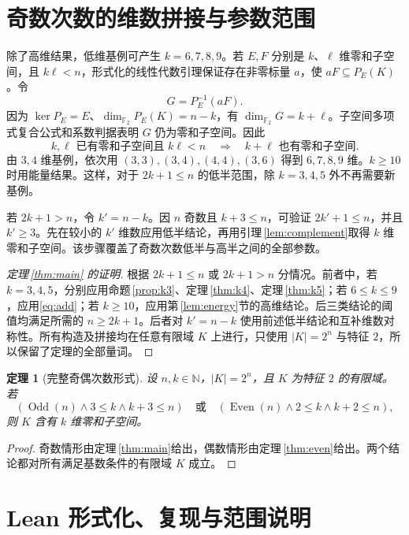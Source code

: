 \documentclass[UTF8,a4paper,11pt]{ctexart}
\numberwithin{equation}{section}
\newtheorem{theorem}{定理}[section]
\theoremstyle{definition}
\theoremstyle{remark}
\newcommand{\Ftwo}{\mathbb F_2}
\newcommand{\dimf}{\dim_{\Ftwo}}
\begin{document}
\section{奇数次数的维数拼接与参数范围}

除了高维结果，低维基例可产生 $k=6,7,8,9$。若 $E,F$ 分别是 $k$、$\ell$ 维零和子空间，且 $k\ell<n$，形式化的线性代数引理保证存在非零标量 $a$，使 $aF\subseteq P_E(K)$。令
\[
 G=P_E^{-1}(aF).
\]
因为 $\ker P_E=E$、$\dimf P_E(K)=n-k$，有 $\dimf G=k+\ell$。子空间多项式复合公式和系数判据表明 $G$ 仍为零和子空间。因此
\begin{equation}\label{eq:add}
 k,\ell\text{ 已有零和子空间且 }k\ell<n
 \quad\Longrightarrow\quad k+\ell\text{ 也有零和子空间}.
\end{equation}
由 $3,4$ 维基例，依次用 $(3,3),(3,4),(4,4),(3,6)$ 得到 $6,7,8,9$ 维。$k\ge10$ 时用能量结果。这样，对于 $2k+1\le n$ 的低半范围，除 $k=3,4,5$ 外不再需要新基例。

若 $2k+1>n$，令 $k'=n-k$。因 $n$ 奇数且 $k+3\le n$，可验证 $2k'+1\le n$，并且 $k'\ge3$。先在较小的 $k'$ 维数应用低半结论，再用引理\,\ref{lem:complement}取得 $k$ 维零和子空间。该步骤覆盖了奇数次数低半与高半之间的全部参数。

\begin{proof}[定理\,\ref{thm:main} 的证明]
根据 $2k+1\le n$ 或 $2k+1>n$ 分情况。前者中，若 $k=3,4,5$，分别应用命题\,\ref{prop:k3}、定理\,\ref{thm:k4}、定理\,\ref{thm:k5}；若 $6\le k\le9$，应用\eqref{eq:add}；若 $k\ge10$，应用第\,\ref{lem:energy}节的高维结论。后三类结论的阈值均满足所需的 $n\ge2k+1$。后者对 $k'=n-k$ 使用前述低半结论和互补维数对称性。所有构造及拼接均在任意有限域 $K$ 上进行，只使用 $|K|=2^n$ 与特征 $2$，所以保留了定理的全部量词。
\end{proof}

\begin{theorem}[完整奇偶次数形式]\label{thm:full}
设 $n,k\in\mathbb N$，$|K|=2^n$，且 $K$ 为特征 $2$ 的有限域。若
\[
 (\operatorname{Odd}(n)\land 3\le k\land k+3\le n)
 \quad\text{或}\quad
 (\operatorname{Even}(n)\land 2\le k\land k+2\le n),
\]
则 $K$ 含有 $k$ 维零和子空间。
\end{theorem}
\begin{proof}
奇数情形由定理\,\ref{thm:main}给出，偶数情形由定理\,\ref{thm:even}给出。两个结论都对所有满足基数条件的有限域 $K$ 成立。
\end{proof}

\section{Lean 形式化、复现与范围说明}\label{sec:formal}
\sloppy
\end{document}
